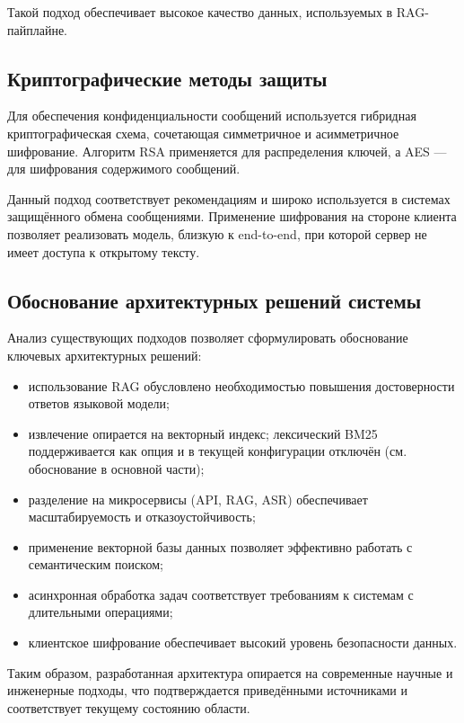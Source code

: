 \documentclass{article}
\begin{document}
Такой подход обеспечивает высокое качество данных, используемых в RAG-пайплайне.

\subsection{Криптографические методы защиты}

Для обеспечения конфиденциальности сообщений используется гибридная криптографическая схема, сочетающая симметричное и асимметричное шифрование. Алгоритм RSA \cite{rivest1978method} применяется для распределения ключей, а AES \cite{daemen2002design} — для шифрования содержимого сообщений.

Данный подход соответствует рекомендациям \cite{menezes1996handbook} и широко используется в системах защищённого обмена сообщениями. Применение шифрования на стороне клиента позволяет реализовать модель, близкую к end-to-end, при которой сервер не имеет доступа к открытому тексту.

\subsection{Обоснование архитектурных решений системы}

Анализ существующих подходов позволяет сформулировать обоснование ключевых архитектурных решений:

\begin{itemize}
\item использование RAG обусловлено необходимостью повышения достоверности ответов языковой модели;
\item извлечение опирается на векторный индекс; лексический BM25 поддерживается как опция и в текущей конфигурации отключён (см. обоснование в основной части);
\item разделение на микросервисы (API, RAG, ASR) обеспечивает масштабируемость и отказоустойчивость;
\item применение векторной базы данных позволяет эффективно работать с семантическим поиском;
\item асинхронная обработка задач соответствует требованиям к системам с длительными операциями;
\item клиентское шифрование обеспечивает высокий уровень безопасности данных.
\end{itemize}

Таким образом, разработанная архитектура опирается на современные научные и инженерные подходы, что подтверждается приведёнными источниками и соответствует текущему состоянию области.
\end{document}
